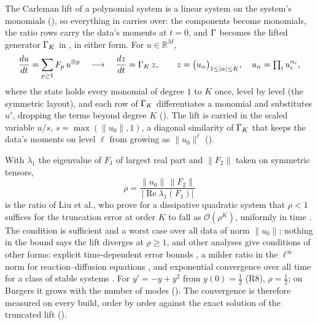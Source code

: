 The Carleman lift of a polynomial system is a linear system on the system's monomials \cite{carleman1932,kowalskisteeb1991,liu2021carleman,krovi2023improved} (), so everything in  carries over: the components become monomials, the ratio rows carry the data's moments at $t=0$, and $\Gamma$ becomes the lifted generator $\Gamma_K$ in , in either form. For $u\in\mathbb{R}^M$,
\begin{equation}
    \frac{du}{dt}=\sum_{p\ge1}F_p\,u^{\otimes p}
    \quad\longrightarrow\quad
    \frac{dz}{dt}=\Gamma_K\,z,
    \qquad
    z=\bigl(u_\alpha\bigr)_{1\le|\alpha|\le K},\quad u_\alpha=\textstyle\prod_iu_i^{\alpha_i},
    \label{eq:carleman-lift}
\end{equation}
where the state holds every monomial of degree $1$ to $K$ once, level by level (the symmetric layout), and each row of $\Gamma_K$ differentiates a monomial and substitutes $u'$, dropping the terms beyond degree $K$ (). The lift is carried in the scaled variable $u/s$, $s=\max(\|u_0\|,1)$, a diagonal similarity of $\Gamma_K$ that keeps the data's moments on level $\ell$ from growing as $\|u_0\|^\ell$ ().

With $\lambda_1$ the eigenvalue of $F_1$ of largest real part and $\|F_2\|$ taken on symmetric tensors,
\begin{equation}
    \rho=\frac{\|u_0\|\,\|F_2\|}{\bigl|\operatorname{Re}\lambda_1(F_1)\bigr|}
    \label{eq:carleman-ratio}
\end{equation}
is the ratio of Liu et al., who prove for a dissipative quadratic system that $\rho<1$ suffices for the truncation error at order $K$ to fall as $\mathcal{O}(\rho^K)$, uniformly in time \cite{liu2021carleman}. The condition is sufficient and a worst case over all data of norm $\|u_0\|$; nothing in the bound says the lift diverges at $\rho\ge1$, and other analyses give conditions of other forms: explicit time-dependent error bounds \cite{forets2017carleman}, a milder ratio in the $\ell^\infty$ norm for reaction--diffusion equations \cite{liu2023reactiondiffusion}, and exponential convergence over all time for a class of stable systems \cite{amini2025carleman}. For $y'=-y+y^2$ from $y(0)=\tfrac12$ (R8), $\rho=\tfrac12$; on Burgers it grows with the number of modes (). The convergence is therefore measured on every build, order by order against the exact solution of the truncated lift ().

